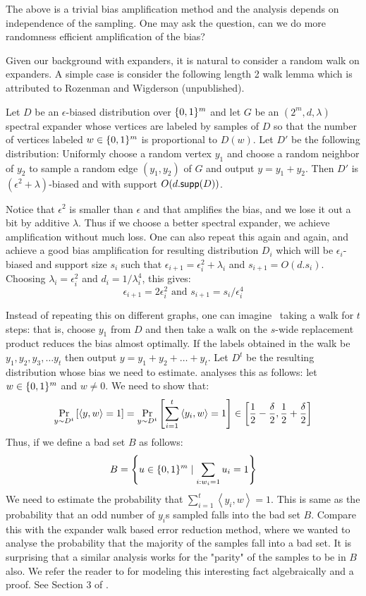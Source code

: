 \begin{curiousity}
The above is a trivial bias amplification method and the analysis depends on independence of the sampling. One may ask the question, can we do more randomness efficient amplification of the bias? 

Given our background with expanders, it is natural to consider a random walk on expanders. A simple case is consider the following length 2 walk lemma which is attributed to Rozenman and Wigderson (unpublished).
\begin{lemma}
Let $D$ be an $\epsilon$-biased distribution over $\{0,1\}^m$ and let $G$ be an $(2^m,d,\lambda)$ spectral expander whose vertices are labeled by samples of $D$ so that the number of vertices labeled $w \in \{0,1\}^m$ is proportional to $D(w)$. Let $D'$ be the following distribution: Uniformly choose a random vertex $y_1$ and choose a random neighbor of $y_2$ to sample a random edge $(y_1,y_2)$ of $G$
and output $y=y_1+y_2$. Then $D'$ is $(\epsilon^2+ \lambda)$-biased and with support $O(d.{\mathsf{supp}}(D))$.
\end{lemma}
Notice that $\epsilon^2$ is smaller than $\epsilon$ and that amplifies the bias, and we lose it out a bit by additive $\lambda$. Thus if we choose a better spectral expander, we achieve amplification without much loss. One can also repeat this again and again, and achieve a good bias amplification for resulting distribution $D_i$ which will be $\epsilon_i$-biased and support size $s_i$ such that $\epsilon_{i+1} = \epsilon_i^2+\lambda_i$ and $s_{i+1} = O(d.s_i)$. Choosing $\lambda_i = \epsilon_i^2$ and $d_i = 1/\lambda_i^4$, this gives:
$$\epsilon_{i+1} = 2\epsilon_i^2 \textrm{ and } s_{i+1} = s_i/\epsilon_i^4$$

Instead of repeating this on different graphs, one can imagine~\cite{Tas17} taking a walk for $t$ steps: that is, choose $y_1$ from $D$ and then take a walk on the $s$-wide replacement product reduces the bias almost optimally. If the labels obtained in the walk be $y_1, y_2, y_3, \ldots y_t$ then output $y = y_1+y_2+\ldots+y_t$. Let $D^t$ be the resulting distribution whose bias we need to estimate. \cite{Tas17} analyses this as follows: let $w \in \{0,1\}^m$ and $w \ne 0$. We need to show that:
$$\Pr_{y \sim D^t} \left[ \langle y, w \rangle = 1 \right] = \Pr_{y \sim D^t} \left[ \sum_{i=1}^t \left\langle y_i, w \right\rangle = 1\right]
 \in \left[ \frac{1}{2}-\frac{\delta}{2},\frac{1}{2}+\frac{\delta}{2}\right] $$
Thus, if we define a bad set $B$ as follows:
$$B = \left\{ u \in \{0,1\}^m \mid \sum_{i:w_i=1} u_i = 1  \right\}$$ 
We need to estimate the probability that $\sum_{i=1}^t \left\langle y_i, w \right\rangle = 1$. This is same as the probability that an odd number of $y_i$s sampled falls into the bad set $B$. Compare this with the expander walk based error reduction method, where we wanted to analyse the probability that the majority of the samples fall into a bad set. It is surprising that a similar analysis works for the "parity" of the samples to be in $B$ also. We refer the reader to \cite{Tas17} for modeling this interesting fact algebraically and a proof. See Section 3 of \cite{Tas17}.
\end{curiousity}

